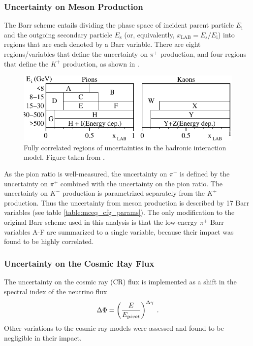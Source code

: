 \subsubsection{Uncertainty on Meson Production}
The Barr scheme entails dividing the phase space of incident parent particle $E_\mathrm{i}$ and the outgoing secondary particle $E_\mathrm{s}$ (or, equivalently, $x_{\mathrm{LAB}}=E_\mathrm{s}/E_\mathrm{i}$) into regions that are each denoted by a Barr variable. There are eight regions/variables that define the uncertainty on $ \pi^+ $ production, and four regions that define the $K^+$ production, as shown in . 
\begin{figure}
    \centering
    \includegraphics[width=0.8\linewidth]{figures/measurement/systematics/flux/barr_blocks.pdf}
    \caption{Fully correlated regions of uncertainties in the hadronic interaction model. Figure taken from \cite{Barr2006}.}
\end{figure}
As the pion ratio is well-measured, the uncertainty on $ \pi^- $ is defined by the uncertainty on $ \pi^+ $ combined with the uncertainty on the pion ratio. The uncertainty on $ K^- $ production is parametrized separately from the $K^+$ production. Thus the uncertainty from meson production is described by 17 Barr variables (see table \ref{table:mceq_cfg_params}). 
The only modification to the original Barr scheme used in this analysis is that the low-energy $ \pi^+ $ Barr variables A-F are summarized to a single variable, because their impact was found to be highly correlated.


\subsubsection{Uncertainty on the Cosmic Ray Flux}
The uncertainty on the cosmic ray (CR) flux is implemented as a shift in the spectral index of the neutrino flux
\begin{equation}
    \Delta \Phi = \left( \frac{E}{E_{\rm pivot}}\right)^{\Delta \gamma}\;.
\end{equation}
Other variations to the cosmic ray models were assessed and found to be negligible in their impact.

